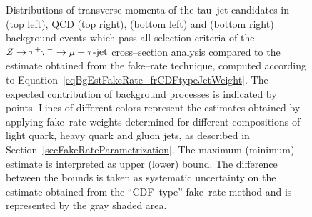 \begin{figure}[t]
\begin{center}
\begin{picture}
\end{picture}
\caption[Tau--jet transverse momentum in the Fake--rate method]{\captiontext
Distributions of transverse momenta of the tau--jet candidates in \WpJets (top
left), QCD (top right), \ttbarpJets (bottom left) and \ZMM (bottom right)
background events which pass all selection criteria of the $\ZTT \to \mu +
\tau\mbox{-jet}$ cross--section analysis compared to the estimate obtained from
the fake--rate technique, computed according to
Equation~\ref{eqBgEstFakeRate_frCDFtypeJetWeight}.  The expected contribution of
background processes is indicated by points.  Lines of different colors
represent the estimates obtained by applying fake--rate weights determined for
different compositions of light quark, heavy quark and gluon jets, as described
in Section~\ref{secFakeRateParametrization}.  The maximum (minimum) estimate is
interpreted as upper (lower) bound.  The difference between the bounds is taken
as systematic uncertainty on the estimate obtained from the ``CDF--type''
fake--rate method and is represented by the gray shaded area.}
\label{figBgEstFakeRate_frCDFtypeResults_tauJetPt}
\end{center}
\end{figure} 

